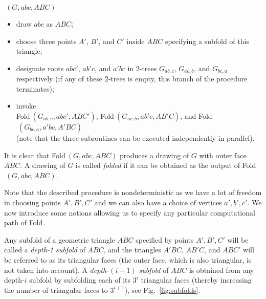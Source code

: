 \documentclass[reqno,12pt]{amsart}
\newcommand{\shift}{\mbox{}\hspace{4.5mm}}
\newcommand{\foldn}[1]{{\sc Fold}$^{#1}$}
\newcommand{\fold}[2]{{\sc Fold}$^{#1}\,(#2)$}
\begin{document}
\medskip

\shift\fold{}{G,abc,ABC}\\[-6.5mm]
\begin{itemize}
\item
draw $abc$ as $ABC$;
\item
choose three points $A'$, $B'$, and $C'$ inside $ABC$ specifying a subfold of
this triangle;
\item
designate roots $abc'$, $ab'c$, and $a'bc$ in 2-trees  $G_{ab,c}$, $G_{ac,b}$, and $G_{bc,a}$
respectively (if any of these 2-trees is empty, this branch of the procedure terminates);
\item
invoke\\
\fold{}{G_{ab,c},abc',ABC'}, 
\fold{}{G_{ac,b},ab'c,AB'C}, and  
\fold{}{G_{bc,a},a'bc,A'BC}\\
(note that the three subroutines can be executed independently in parallel).
\end{itemize}

\smallskip

It is clear that \fold{}{G,abc,ABC} produces a drawing of $G$ with outer face $ABC$.
A drawing of $G$ is called \emph{folded} if it can be obtained as the output of \fold{}{G,abc,ABC}.

Note that the described procedure is nondeterministic as we have a lot of freedom
in choosing points $A',B',C'$ and we can also have a choice of vertices $a',b',c'$.
We now introduce some notions allowing us to specify any particular computational
path of \foldn{}.

Any subfold of a geometric triangle $ABC$ specified by points $A',B',C'$
will be called a \emph{depth-1 subfold} of $ABC$, and the triangles
$A'BC$, $AB'C$, and $ABC'$ will be referred to as its triangular faces
(the outer face, which is also triangular, is not taken into account).
A \emph{depth-$(i+1)$ subfold} of $ABC$ is obtained from any depth-$i$ subfold
by subfolding each of its $3^i$ triangular faces (thereby increasing
the number of triangular faces to $3^{i+1}$), see Fig.~\ref{fig:subfolds}.
\end{document}
